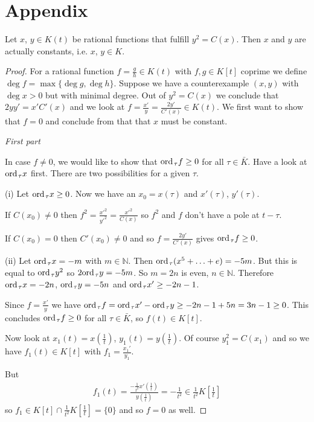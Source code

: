 \documentclass[english,11pt,a4paper]{article}
\begin{document}
\newpage

\section*{Appendix}

\setcounter{theorem}{0}

\begin{theorem}
  Let $x$, $y \in K(t)$ be rational functions that fulfill $y^2 = C(x)$. Then $x$ and $y$ are actually constants, i.e. $x$, $y \in K$.
  \begin{proof}
    For a rational function $f= \frac g h \in K(t)$ with $f, g \in K[t]$ coprime we define $\deg f = \max \{ \deg g , \deg h \}$. Suppose we have a counterexample $(x,y)$ with $\deg x > 0$ but with minimal degree. Out of $y^2 = C(x)$ we conclude that $2y y' = x' C'(x)$ and we look at $f = \frac{x'}{y} = \frac{2y'}{C'(x)} \in K(t)$. We first want to show that $f = 0$ and conclude from that that $x$ must be constant.

    \textit{First part}

    In case $f \neq 0$, we would like to show that $\text{ord\hspace{0.4mm}}_{\tau} f \geq 0$ for all $\tau \in \bar K$. Have a look at $\text{ord\hspace{0.4mm}}_{\tau} x$ first. There are two possibilities for a given $\tau$.

    (i) Let $\text{ord\hspace{0.4mm}}_{\tau} x \geq 0$. Now we have an $x_0 = x(\tau)$ and $x'(\tau)$, $y'(\tau)$.

    If $C(x_0) \neq 0$ then $f^2=\frac{x'^2}{y'^2} = \frac{x'^2}{C(x)}$ so $f^2$ and $f$ don't have a pole at $t-\tau$.

    If $C(x_0) = 0$ then $C'(x_0) \neq 0$ and so $f= \frac{2y'}{C'(x)}$ gives $\text{ord\hspace{0.4mm}}_\tau f \geq 0$.

    (ii) Let $\text{ord\hspace{0.4mm}}_{\tau} x = -m$ with $m \in \mathds{N}$. Then $\text{ord\hspace{0.4mm}}_\tau (x^5+\ldots+e) = -5m$. But this is equal to $\text{ord\hspace{0.4mm}}_\tau y^2$ so $2 \text{ord\hspace{0.4mm}}_\tau y = -5m$. So $m = 2n$ is even, $n \in \mathds{N}$. Therefore $\text{ord\hspace{0.4mm}}_{\tau} x = -2n$, $\text{ord\hspace{0.4mm}}_{\tau} y = -5n$ and $\text{ord\hspace{0.4mm}}_{\tau} x' \geq -2n-1$.

    Since $f = \frac{x'}{y}$ we have $\text{ord\hspace{0.4mm}}_\tau f = \text{ord\hspace{0.4mm}}_\tau x' - \text{ord\hspace{0.4mm}}_\tau y \geq -2n -1 +5n = 3n -1 \geq 0$. This concludes $\text{ord\hspace{0.4mm}}_{\tau} f \geq 0$ for all $\tau \in \bar K$, so $f(t) \in K[t]$.

    Now look at $x_1(t) = x(\frac 1 t )$, $y_1(t) = y(\frac 1 t )$. Of course $y_1^2 = C(x_1)$ and so we have $f_1(t) \in K[t]$ with $f_1 = \frac{x_1'}{y_1}$.

    But
    \begin{align*}
      f_1(t) = \frac{-\frac{1}{t^2} x'(\frac 1 t)}{y(\frac 1 t )} = - \frac{1}{t^2} \in \frac{1}{t^2} K[\frac{1}{t}]
    \end{align*}
    so $f_1 \in K[t] \cap \frac{1}{t^2} K[\frac{1}{t}] = \{0 \}$ and so $f= 0$ as well.


\end{proof}
\end{theorem}
\end{document}
